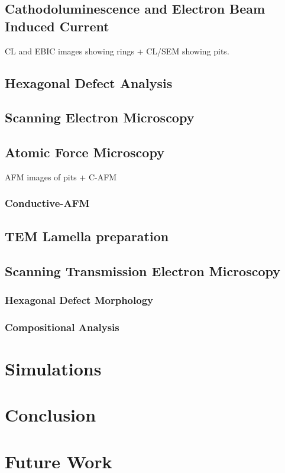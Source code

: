 \FloatBarrier
\subsection{Cathodoluminescence and Electron Beam Induced Current}
CL and EBIC images showing rings + CL/SEM showing pits.

\subsection{Hexagonal Defect Analysis}

\subsection{Scanning Electron Microscopy}

\subsection{Atomic Force Microscopy}
AFM images of pits + C-AFM
\subsubsection{Conductive-AFM}

\subsection{TEM Lamella preparation}

\subsection{Scanning Transmission Electron Microscopy}
\subsubsection{Hexagonal Defect Morphology}
\subsubsection{Compositional Analysis}

\section{Simulations}

\section{Conclusion}

\section{Future Work}

